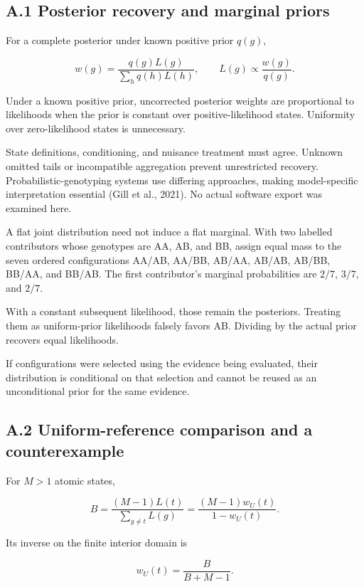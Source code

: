 \documentclass[
]{article}
\begin{document}
\subsection{A.1 Posterior recovery and marginal
priors}\label{a.1-posterior-recovery-and-marginal-priors}

For a complete posterior under known positive prior \(q(g)\),

\[
w(g)=\frac{q(g)L(g)}{\sum_hq(h)L(h)},
\qquad
L(g)\propto\frac{w(g)}{q(g)}.
\]

Under a known positive prior, uncorrected posterior weights are
proportional to likelihoods when the prior is constant over
positive-likelihood states. Uniformity over zero-likelihood states is
unnecessary.

State definitions, conditioning, and nuisance treatment must agree.
Unknown omitted tails or incompatible aggregation prevent unrestricted
recovery. Probabilistic-genotyping systems use differing approaches,
making model-specific interpretation essential (Gill et al., 2021). No
actual software export was examined here.

A flat joint distribution need not induce a flat marginal. With two
labelled contributors whose genotypes are AA, AB, and BB, assign equal
mass to the seven ordered configurations AA/AB, AA/BB, AB/AA, AB/AB,
AB/BB, BB/AA, and BB/AB. The first contributor's marginal probabilities
are \(2/7\), \(3/7\), and \(2/7\).

With a constant subsequent likelihood, those remain the posteriors.
Treating them as uniform-prior likelihoods falsely favors AB. Dividing
by the actual prior recovers equal likelihoods.

If configurations were selected using the evidence being evaluated,
their distribution is conditional on that selection and cannot be reused
as an unconditional prior for the same evidence.

\subsection{A.2 Uniform-reference comparison and a
counterexample}\label{a.2-uniform-reference-comparison-and-a-counterexample}

For \(M>1\) atomic states,

\[
B=\frac{(M-1)L(t)}{\sum_{g\ne t}L(g)}
=\frac{(M-1)w_U(t)}{1-w_U(t)}.
\]

Its inverse on the finite interior domain is

\[
w_U(t)=\frac{B}{B+M-1}.
\]
\end{document}
